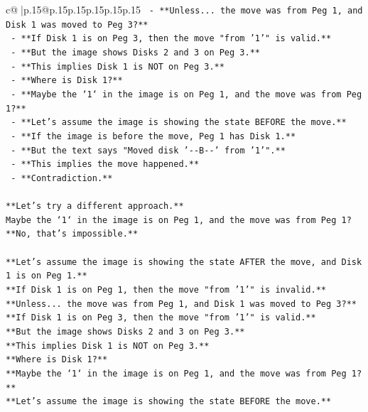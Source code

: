 \documentclass{article}
\begin{document}
{\begin{supertabular}{c@{$\;$}|p{.15\linewidth}@{}p{.15\linewidth}p{.15\linewidth}p{.15\linewidth}p{.15\linewidth}p{.15\linewidth}}
{{{\texttt{              {-} **Unless... the move was from Peg 1, and Disk 1 was moved to Peg 3?**} \\
\texttt{              {-} **If Disk 1 is on Peg 3, then the move "from '1'" is valid.**} \\
\texttt{              {-} **But the image shows Disks 2 and 3 on Peg 3.**} \\
\texttt{              {-} **This implies Disk 1 is NOT on Peg 3.**} \\
\texttt{              {-} **Where is Disk 1?**} \\
\texttt{              {-} **Maybe the `1` in the image is on Peg 1, and the move was from Peg 1?**} \\
\texttt{              {-} **Let's assume the image is showing the state BEFORE the move.**} \\
\texttt{              {-} **If the image is before the move, Peg 1 has Disk 1.**} \\
\texttt{              {-} **But the text says "Moved disk '{-}{-}B{-}{-}' from '1'".**} \\
\texttt{              {-} **This implies the move happened.**} \\
\texttt{              {-} **Contradiction.**} \\
\\ 
\texttt{**Let's try a different approach.**} \\
\texttt{Maybe the `1` in the image is on Peg 1, and the move was from Peg 1?} \\
\texttt{**No, that's impossible.**} \\
\\ 
\texttt{**Let's assume the image is showing the state AFTER the move, and Disk 1 is on Peg 1.**} \\
\texttt{**If Disk 1 is on Peg 1, then the move "from '1'" is invalid.**} \\
\texttt{**Unless... the move was from Peg 1, and Disk 1 was moved to Peg 3?**} \\
\texttt{**If Disk 1 is on Peg 3, then the move "from '1'" is valid.**} \\
\texttt{**But the image shows Disks 2 and 3 on Peg 3.**} \\
\texttt{**This implies Disk 1 is NOT on Peg 3.**} \\
\texttt{**Where is Disk 1?**} \\
\texttt{**Maybe the `1` in the image is on Peg 1, and the move was from Peg 1?**} \\
\texttt{**Let's assume the image is showing the state BEFORE the move.**} \\
}}}
\end{supertabular}}
\end{document}
